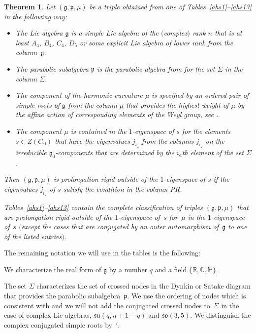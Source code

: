 \documentclass[pdftex]{sigma}
\newcommand{\fg}{\mathfrak g}
\newcommand{\fp}{\mathfrak p}
\numberwithin{equation}{section}
\newtheorem{Theorem}{Theorem}[section]
\begin{document}
\begin{Theorem} \label{t3.5}
Let $(\fg,\fp,\mu)$ be a triple obtained from one of Tables~{\rm \ref{ahs1}--\ref{ahs13}} in the following way:
\begin{itemize}\itemsep=0pt
\item The Lie algebra $\fg$ is a simple Lie algebra of the $($complex$)$ rank $n$ that is at least $A_4$, $B_4$, $C_4$, $D_5$ or some explicit Lie algebra of lower rank from the column~$\fg$.
\item The parabolic subalgebra $\fp$ is the parabolic algebra from {\rm \cite[Section 3.2.9]{parabook}} for the set $\Sigma$ in the column $\Sigma$.
\item The component of the harmonic curvature $\mu$ is specified by an ordered pair of simple roots of $\fg$ from the column $\mu$ that provides the highest weight of $\mu$ by the affine action of corresponding elements of the Weyl group, see {\rm \cite[Theorem 3.3.5]{parabook}}.
\item The component $\mu$ is contained in the $1$-eigenspace of $s$ for the elements $s\in Z(G_0)$ that have the eigenvalues $j_{i_a}$ from the columns $j_{i_a}$ on the irreducible $\fg_0$-components that are determined by the $i_a$th element of the set $\Sigma$.
\end{itemize}
Then $(\fg,\fp,\mu)$ is prolongation rigid outside of the $1$-eigenspace of $s$ if the eigenvalues $j_{i_a}$ of $s$ satisfy the condition in the column PR.

Tables~{\rm \ref{ahs1}--\ref{ahs13}} contain the complete classification of triples $(\fg,\fp,\mu)$ that are prolongation rigid outside of the $1$-eigenspace of~$s$ for~$\mu$ in the $1$-eigenspace of~$s$ $($except the cases that are conjugated by an outer automorphism of~$\fg$ to one of the listed entries$)$.
\end{Theorem}

The remaining notation we will use in the tables is the following:

We characterize the real form of $\fg$ by a number $q$ and a f\/ield $\{\mathbb{R, C, H}\}$.

The set $\Sigma$ characterizes the set of crossed nodes in the Dynkin or Satake diagram that provides the parabolic subalgebra~$\fp$. We use the ordering of nodes which is consistent with \cite[Appendix~B]{parabook} and we will not add the conjugated crossed nodes to~$\Sigma$ in the case of complex Lie algebras, $\mathfrak{su}(q,n+1-q)$ and $\mathfrak{so}(3,5)$. We distinguish the complex conjugated simple roots by~$'$.
\end{document}
